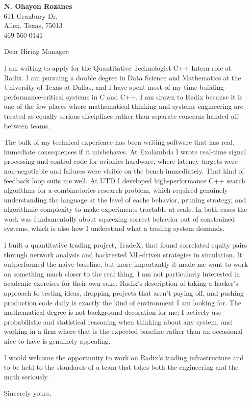 \documentclass{letter}
\begin{document}
\signature{N. Ohayon Rozanes}
\longindentation=0pt
\let\raggedleft\raggedright

\begin{letter}{}

  \begin{center}
    {\large\bf N. Ohayon Rozanes} \\
    {611 Granbury Dr. \\ Allen, Texas, 75013 \\ 469-560-0141}
  \end{center} \vfill

  \opening{Dear Hiring Manager:}

  \noindent I am writing to apply for the Quantitative Technologist C++
  Intern role at Radix. I am pursuing a double degree in Data Science
  and Mathematics at the University of Texas at Dallas, and I have spent
  most of my time building performance-critical systems in C and C++. I
  am drawn to Radix because it is one of the few places where mathematical
  thinking and systems engineering are treated as equally serious disciplines
  rather than separate concerns handed off between teams.

  \noindent The bulk of my technical experience has been writing software
  that has real, immediate consequences if it misbehaves. At Exolambda I
  wrote real-time signal processing and control code for avionics hardware,
  where latency targets were non-negotiable and failures were visible on the
  bench immediately. That kind of feedback loop suits me well. At UTD I
  developed high-performance C++ search algorithms for a combinatorics
  research problem, which required genuinely understanding the language at
  the level of cache behavior, pruning strategy, and algorithmic complexity
  to make experiments tractable at scale. In both cases the work was
  fundamentally about squeezing correct behavior out of constrained systems,
  which is also how I understand what a trading system demands.

  \noindent I built a quantitative trading project, TradeX, that found
  correlated equity pairs through network analysis and backtested ML-driven
  strategies in simulation. It outperformed the naive baseline, but more
  importantly it made me want to work on something much closer to the real
  thing. I am not particularly interested in academic exercises for their
  own sake. Radix's description of taking a hacker's approach to testing
  ideas, dropping projects that aren't paying off, and pushing production
  code daily is exactly the kind of environment I am looking for. The
  mathematical degree is not background decoration for me; I actively use
  probabilistic and statistical reasoning when thinking about any system,
  and working in a firm where that is the expected baseline rather than an
  occasional nice-to-have is genuinely appealing.

  \noindent I would welcome the opportunity to work on Radix's trading
  infrastructure and to be held to the standards of a team that takes
  both the engineering and the math seriously.

  \closing{Sincerely yours,}

\end{letter}
\end{document}
